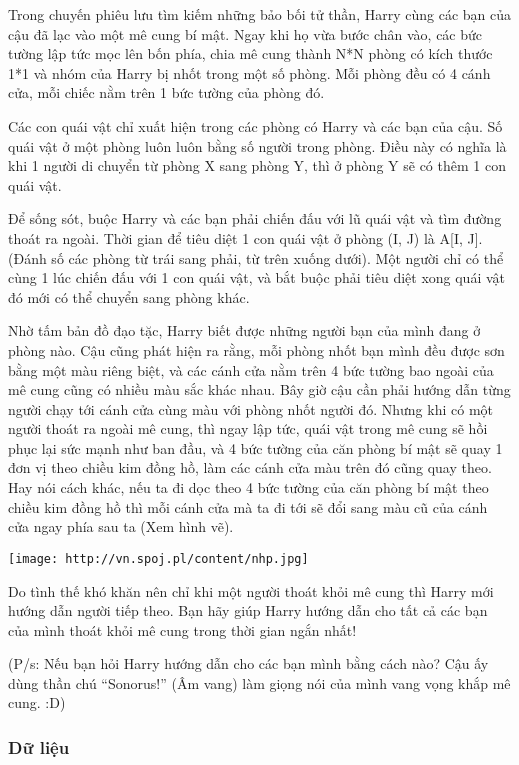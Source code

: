 

Trong chuyến phiêu lưu tìm kiếm những bảo bối tử thần, Harry cùng các bạn của cậu đã lạc vào một mê cung bí mật. Ngay khi họ vừa bước chân vào, các bức tường lập tức mọc lên bốn phía, chia mê cung thành N*N phòng có kích thước 1*1 và nhóm của Harry bị nhốt trong một số phòng. Mỗi phòng đều có 4 cánh cửa, mỗi chiếc nằm trên 1 bức tường của phòng đó.

Các con quái vật chỉ xuất hiện trong các phòng có Harry và các bạn của cậu. Số quái vật ở một phòng luôn luôn bằng số người trong phòng. Điều này có nghĩa là khi 1 người di chuyển từ phòng X sang phòng Y, thì ở phòng Y sẽ có thêm 1 con quái vật.

Để sống sót, buộc Harry và các bạn phải chiến đấu với lũ quái vật và tìm đường thoát ra ngoài. Thời gian để tiêu diệt 1 con quái vật ở phòng (I, J) là A[I, J]. (Đánh số các phòng từ trái sang phải, từ trên xuống dưới). Một người chỉ có thể cùng 1 lúc chiến đấu với 1 con quái vật, và bắt buộc phải tiêu diệt xong quái vật đó mới có thể chuyển sang phòng khác.

Nhờ tấm bản đồ đạo tặc, Harry biết được những người bạn của mình đang ở phòng nào. Cậu cũng phát hiện ra rằng, mỗi phòng nhốt bạn mình đều được sơn bằng một màu riêng biệt, và các cánh cửa nằm trên 4 bức tường bao ngoài của mê cung cũng có nhiều màu sắc khác nhau. Bây giờ cậu cần phải hướng dẫn từng người chạy tới cánh cửa cùng màu với phòng nhốt người đó. Nhưng khi có một người thoát ra ngoài mê cung, thì ngay lập tức, quái vật trong mê cung sẽ hồi phục lại sức mạnh như ban đầu, và 4 bức tường của căn phòng bí mật sẽ quay 1 đơn vị theo chiều kim đồng hồ, làm các cánh cửa màu trên đó cũng quay theo. Hay nói cách khác, nếu ta đi dọc theo 4 bức tường của căn phòng bí mật theo chiều kim đồng hồ thì mỗi cánh cửa mà ta đi tới sẽ đổi sang màu cũ của cánh cửa ngay phía sau ta (Xem hình vẽ).


\texttt{[image: http://vn.spoj.pl/content/nhp.jpg]}

Do tình thế khó khăn nên chỉ khi một người thoát khỏi mê cung thì Harry mới hướng dẫn người tiếp theo. Bạn hãy giúp Harry hướng dẫn cho tất cả các bạn của mình thoát khỏi mê cung trong thời gian ngắn nhất!

(P/s: Nếu bạn hỏi Harry hướng dẫn cho các bạn mình bằng cách nào? Cậu ấy dùng thần chú “Sonorus!” (Âm vang) làm giọng nói của mình vang vọng khắp mê cung. :D)

\subsubsection{Dữ liệu}

